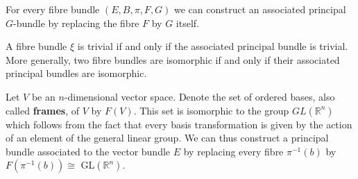 	
	\begin{example}
		For every fibre bundle $(E, B, \pi, F, G)$ we can construct an associated principal $G$-bundle by replacing the fibre $F$ by $G$ itself.
	\end{example}
	\begin{property}
		A fibre bundle $\xi$ is trivial if and only if the associated principal bundle is trivial. More generally, two fibre bundles are isomorphic if and only if their associated principal bundles are isomorphic.
	\end{property}
	
	\begin{example}
		Let $V$ be an $n$-dimensional vector space. Denote the set of ordered bases, also called \textbf{frames}, of $V$ by $F(V)$. This set is isomorphic to the group $GL(\mathbb{R}^n)$ which follows from the fact that every basis transformation is given by the action of an element of the general linear group. We can thus construct a principal bundle associated to the vector bundle $E$ by replacing every fibre $\pi^{-1}(b)$ by $F(\pi^{-1}(b))\cong$ GL$(\mathbb{R}^n)$.
	\end{example}
	
